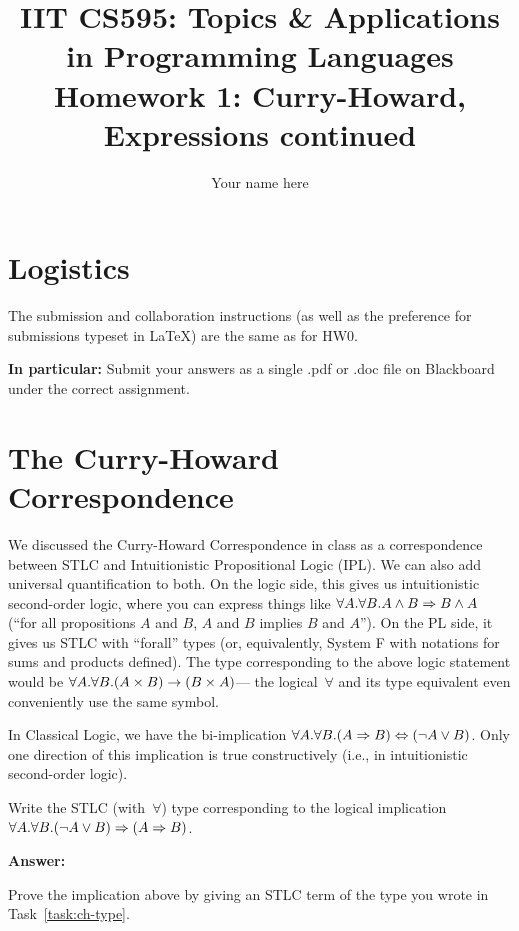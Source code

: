 \documentclass{article}
\title{IIT CS595: Topics \& Applications in Programming Languages\\
  {\large Homework 1: Curry-Howard, Expressions continued}}
\author{Your name here}
\begin{document}
\maketitle

\section*{Logistics}
The submission and collaboration instructions (as well as the preference
for submissions typeset in LaTeX) are the same as for HW0.

\textbf{In particular:}
Submit your answers as a single .pdf or .doc file  on Blackboard
under
the correct assignment. 

\section{The Curry-Howard Correspondence}

We discussed the Curry-Howard Correspondence in class as a correspondence
between STLC and Intuitionistic Propositional Logic (IPL).
%
We can also add universal quantification to both.
%
On the logic side, this gives us intuitionistic second-order logic,
where you can express
things like $\forall A. \forall B. A \land B \Rightarrow B \land A$
(``for all propositions $A$ and $B$, $A$ and $B$ implies $B$ and $A$'').
%
On the PL side, it gives us STLC with ``forall'' types (or, equivalently,
System F with notations for sums and products defined).
%
The type corresponding to the above logic statement would be
$\forall A. \forall B. (A \times B) \rightarrow (B \times A)$---
the logical~$\forall$ and its type equivalent even conveniently use the
same symbol.

In Classical Logic, we have the bi-implication
$\forall A. \forall B. (A \Rightarrow B) \Leftrightarrow (\lnot A \lor B)$.
%
Only one direction of this implication is true constructively (i.e., in
intuitionistic second-order logic).


\begin{task}\label{task:ch-type}
  Write the STLC (with~$\forall$) type corresponding to
  the logical implication $\forall A. \forall B. (\lnot A \lor B) \Rightarrow (A \Rightarrow B)$.
\end{task}

\textbf{Answer:}

\begin{task}
  Prove the implication above by giving an STLC term of the type you wrote in
  Task~\ref{task:ch-type}.
\end{task}
\end{document}

